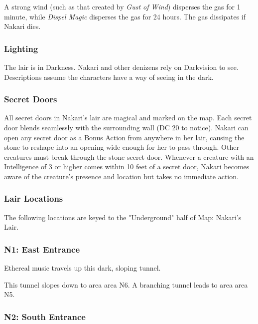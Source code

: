 \documentclass[letterpaper, 11pt, twocolumn]{dndbook}
\begin{document}
A strong wind (such as that created by \textit{Gust of Wind}) disperses the gas for 1 minute, while \textit{Dispel Magic} disperses the gas for 24 hours. The gas dissipates if Nakari dies.

\subsubsection{Lighting}

The lair is in Darkness. Nakari and other denizens rely on Darkvision to see. Descriptions assume the characters have a way of seeing in the dark.

\subsubsection{Secret Doors}

All secret doors in Nakari's lair are magical and marked on the map. Each secret door blends seamlessly with the surrounding wall (DC 20 to notice). Nakari can open any secret door as a Bonus Action from anywhere in her lair, causing the stone to reshape into an opening wide enough for her to pass through. Other creatures must break through the stone secret door. Whenever a creature with an Intelligence of 3 or higher comes within 10 feet of a secret door, Nakari becomes aware of the creature's presence and location but takes no immediate action.

\subsubsection{Lair Locations}



The following locations are keyed to the "Underground" half of Map: Nakari's Lair.

\subsubsection{N1: East Entrance}

\begin{DndReadAloud}
Ethereal music travels up this dark, sloping tunnel.
\end{DndReadAloud}

This tunnel slopes down to area area N6. A branching tunnel leads to area area N5.

\subsubsection{N2: South Entrance}
\end{document}
